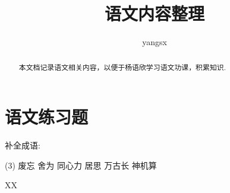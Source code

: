 \documentclass[a4paper]{article}
\title{语文内容整理}
\author{yangsx}
\begin{document}
\maketitle
\tableofcontents

\begin{abstract}
本文档记录语文相关内容，以便于{\large{杨语欣}{}}学习语文功课，积累知识.
\end{abstract}

\newpage





\section{语文练习题}

\begin{question}[tags={xiaoxuecy}]
补全成语:

  \begin{tasks}(3)
     \task 废忘
     \task 舍为
     \task 同心力
     \task 居思
     \task 万古长
     \task 神机算
  \end{tasks}

\end{question}
\begin{solution}
  XX
\end{solution}

\printindex
\end{document}
